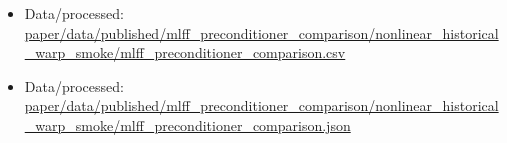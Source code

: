 \begin{itemize}[leftmargin=1.4em,noitemsep]
\item Data/processed: \begingroup\scriptsize\url{paper/data/published/mlff_preconditioner_comparison/nonlinear_historical_warp_smoke/mlff_preconditioner_comparison.csv}\endgroup
\item Data/processed: \begingroup\scriptsize\url{paper/data/published/mlff_preconditioner_comparison/nonlinear_historical_warp_smoke/mlff_preconditioner_comparison.json}\endgroup
\end{itemize}

